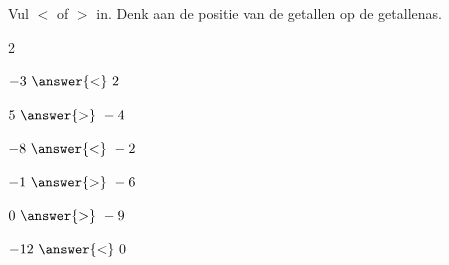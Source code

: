 \documentclass{ximera}
\begin{document}
    
    \begin{oefening}{\oefB}
    
    Vul \(<\) of \(>\) in. Denk aan de positie van de getallen op de getallenas.

    \begin{multicols}{2}
        
  
    
    \begin{question} \(-3\ \answer{<}\ 2\) \end{question}
    
    \begin{question} \(5\ \answer{>}\ -4\) \end{question}
    
    \begin{question} \(-8\ \answer{<}\ -2\) \end{question}
    
    \begin{question} \(-1\ \answer{>}\ -6\) \end{question}
    
    \begin{question} \(0\ \answer{>}\ -9\) \end{question}
    
    \begin{question} \(-12\ \answer{<}\ 0\) \end{question}
\end{multicols}
    
    \end{oefening}
    
\end{document}
